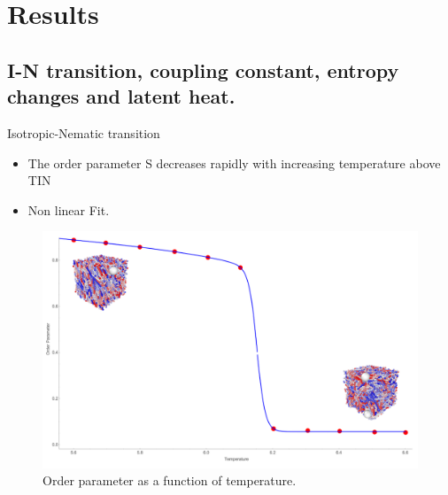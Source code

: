 \documentclass{beamer}
\begin{document}
\section{Results}
\subsection{I-N transition, coupling constant, entropy changes and latent heat.}

\begin{frame}{Isotropic-Nematic transition}
    \begin{itemize}
        \item The order parameter S decreases rapidly with increasing temperature above TIN
        \item Non linear Fit.
    \end{itemize}
    \begin{figure}
        \centering
        \includegraphics[scale = 0.25]{Figures/Transition.png}
        \caption{Order parameter as a function of temperature.}
        \label{fig:enter-label}
    \end{figure}
\end{frame}
\end{document}
